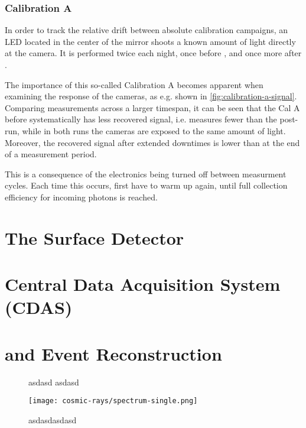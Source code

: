 \subsubsection{Calibration A}

In order to track the relative drift between absolute calibration campaigns, an 
LED located in the center of the mirror shoots a known amount of light directly 
at the \FD camera. It is performed twice each night, once before \DAQ, and once 
more after \DAQ.

The importance of this so-called Calibration A becomes apparent when examining the
response of the \FD cameras, as e.g. shown in \autoref{fig:calibration-a-signal}.
Comparing measurements across a larger timespan, it can be seen that the Cal A
before \DAQ systematically has less recovered signal, i.e. measures fewer \ADC
than the post-\DAQ run, while in both runs the cameras are exposed to the same 
amount of light. Moreover, the recovered signal after extended downtimes is lower
than at the end of a measurement period.

This is a consequence of the \PMT electronics being turned off between measurment 
cycles. Each time this occurs, \PMTs first have to warm up again, until full
collection efficiency for incoming photons is reached.



\section{The Surface Detector}
\label{sec:sd}


\section{Central Data Acquisition System (CDAS)}
\label{sec:cdas}



\section{\Offline and Event Reconstruction}
\label{sec:rec}

\begin{figure}[t]
  \centering
  \hspace{0.2cm}
  \caption[]{ asdasd  asdasd}
  \label{fig:}
\end{figure}

\begin{figure}[t]
  \centering
  \texttt{[image: cosmic-rays/spectrum-single.png]}
  \caption{asdasdasdasd}
  \label{fig:asdasd}
\end{figure}


